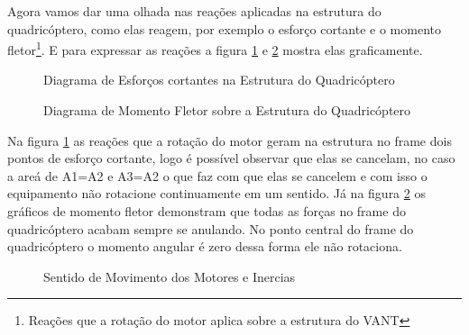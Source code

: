 Agora vamos dar uma olhada nas reações aplicadas na estrutura do quadricóptero, como elas reagem, por exemplo o esforço cortante e o momento fletor\footnote{Reações que a rotação do motor aplica sobre a estrutura do VANT}. E para expressar as reações a figura \ref{fig:esfcort} e \ref{fig:momflet} mostra elas graficamente. 

\begin{figure}[H]
	\centering
	\caption{Diagrama de Esforços cortantes na Estrutura do Quadricóptero}
	\fontsize{9pt}{12pt}\selectfont
	\def\svgwidth{10cm}
	
	\label{fig:esfcort}
\end{figure}


\begin{figure}[H]
	\centering
	\caption{Diagrama de Momento Fletor sobre a Estrutura do Quadricóptero}
	\fontsize{9pt}{12pt}\selectfont
	\def\svgwidth{10cm}
	
	\label{fig:momflet}
\end{figure}

Na figura \ref{fig:esfcort} as reações que a rotação do motor geram na estrutura no frame dois pontos de esforço cortante, logo é possível observar que elas se cancelam, no caso a areá de  A1=A2 e A3=A2 o que faz com que elas se cancelem e com isso o equipamento não rotacione continuamente em um sentido. Já na figura \ref{fig:momflet} os gráficos de momento fletor demonstram que todas as forças no frame do quadricóptero acabam sempre se anulando. No ponto central do frame do quadricóptero o momento angular é zero dessa forma ele não rotaciona\cite{momesf}. 

\begin{figure}[htpb]
	\centering
	\caption{Sentido de Movimento dos Motores e Inercias}
	\fontsize{11pt}{14pt}\selectfont
	\def\svgwidth{13cm}
	
	\label{fig:rotationmot}
\end{figure}

